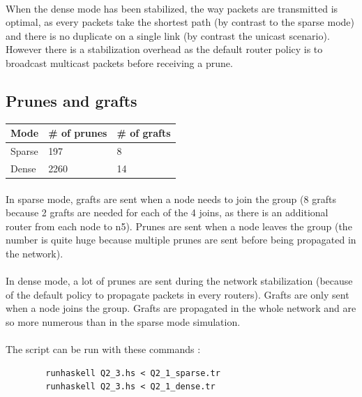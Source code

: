 \documentclass[a4paper]{article}
\begin{document}
    \paragraph{}When the dense mode has been stabilized, the way packets are
transmitted is optimal, as every packets take the shortest path (by contrast to
the sparse mode) and there is no duplicate on a single link (by contrast the
unicast scenario).
\newline However there is a stabilization overhead as the default router policy
is to broadcast multicast packets before receiving a prune.

  \subsection{Prunes and grafts}

    \begin{center}
        \begin{tabular}{|l|l|l|}
            \hline
            Mode   & \# of prunes & \# of grafts \\
            \hline
            Sparse & 197          & 8 \\
            Dense  & 2260         & 14 \\
            \hline
        \end{tabular}
    \end{center}

    \paragraph{}In sparse mode, grafts are sent when a node needs to join the
group (8 grafts because 2 grafts are needed for each of the 4 joins, as
there is an additional router from each node to n5).
\newline Prunes are sent when a node leaves the group (the number is quite huge
because multiple prunes are sent before being propagated in the network).

    \paragraph{}In dense mode, a lot of prunes are sent during the network
stabilization (because of the default policy to propagate packets in every
routers). Grafts are only sent when a node joins the group. Grafts are propagated
in the whole network and are so more numerous than in the sparse mode
simulation.

    \paragraph{}The script can be run with these commands :
    \begin{verbatim}
        runhaskell Q2_3.hs < Q2_1_sparse.tr
        runhaskell Q2_3.hs < Q2_1_dense.tr
    \end{verbatim}
\end{document}
